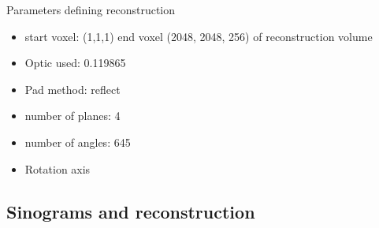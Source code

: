 Parameters defining reconstruction

\begin{itemize}
	\item start voxel: (1,1,1) end voxel (2048, 2048, 256) of reconstruction volume
	\item Optic used: 0.119865	
	\item Pad method: reflect
	\item number of planes: 4
	\item number of angles: 645
	\item Rotation axis
\end{itemize}

\subsection{Sinograms and reconstruction}

